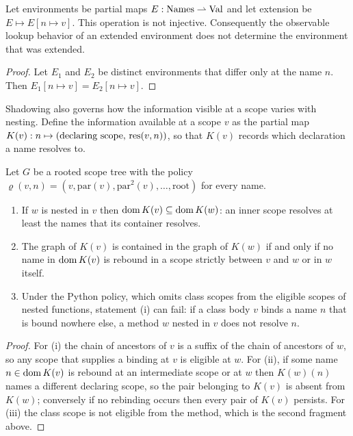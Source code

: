 \begin{proposition}\label{prop:shadow}
Let environments be partial maps $E:\mathrm{Names}\rightharpoonup\mathrm{Val}$ and let extension be $E\mapsto E[n\mapsto v]$. This operation is not injective. Consequently the observable lookup behavior of an extended environment does not determine the environment that was extended.
\end{proposition}
\begin{proof}
Let $E_1$ and $E_2$ be distinct environments that differ only at the name $n$. Then $E_1[n\mapsto v]=E_2[n\mapsto v]$.
\end{proof}

Shadowing also governs how the information visible at a scope varies with nesting. Define the information available at a scope $v$ as the partial map $K(v):n\mapsto(\text{declaring scope},\,\operatorname{res}(v,n))$, so that $K(v)$ records which declaration a name resolves to.

\begin{proposition}\label{prop:visibility}
Let $G$ be a rooted scope tree with the policy $\varrho(v,n)=(v,\mathrm{par}(v),\mathrm{par}^2(v),\dots,\mathrm{root})$ for every name.
\begin{enumerate}[label=(\roman*)]
\item If $w$ is nested in $v$ then $\operatorname{dom} K(v)\subseteq\operatorname{dom} K(w)$: an inner scope resolves at least the names that its container resolves.
\item The graph of $K(v)$ is contained in the graph of $K(w)$ if and only if no name in $\operatorname{dom} K(v)$ is rebound in a scope strictly between $v$ and $w$ or in $w$ itself.
\item Under the Python policy, which omits class scopes from the eligible scopes of nested functions, statement (i) can fail: if a class body $v$ binds a name $n$ that is bound nowhere else, a method $w$ nested in $v$ does not resolve $n$.
\end{enumerate}
\end{proposition}
\begin{proof}
For (i) the chain of ancestors of $v$ is a suffix of the chain of ancestors of $w$, so any scope that supplies a binding at $v$ is eligible at $w$. For (ii), if some name $n\in\operatorname{dom} K(v)$ is rebound at an intermediate scope or at $w$ then $K(w)(n)$ names a different declaring scope, so the pair belonging to $K(v)$ is absent from $K(w)$; conversely if no rebinding occurs then every pair of $K(v)$ persists. For (iii) the class scope is not eligible from the method, which is the second fragment above.
\end{proof}

